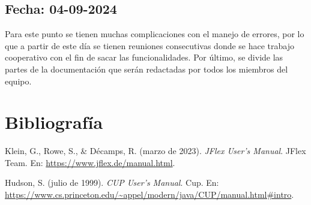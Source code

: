 \documentclass[a4paper,12pt]{article}
\begin{document}
\subsection*{Fecha: 04-09-2024}
\begin{flushleft}
    \hspace*{2em} Para este punto se tienen muchas complicaciones 
	con el manejo de errores, por lo que a partir de este día se 
	tienen reuniones consecutivas donde se hace trabajo cooperativo 
	con el fin de sacar las funcionalidades. Por último, se divide 
	las partes de la documentación que serán redactadas por todos 
	los miembros del equipo.
\end{flushleft}

\newpage
\section*{Bibliografía}
\begin{thebibliography}{9}

Klein, G., Rowe, S., \& Décamps, R. (marzo de 2023).
\emph{JFlex User’s Manual}.
JFlex Team.
En: \url{https://www.jflex.de/manual.html}.

Hudson, S. (julio de 1999).
\emph{CUP User’s Manual}.
Cup.
En: \url{https://www.cs.princeton.edu/~appel/modern/java/CUP/manual.html#intro}.

\end{thebibliography}
\end{document}
